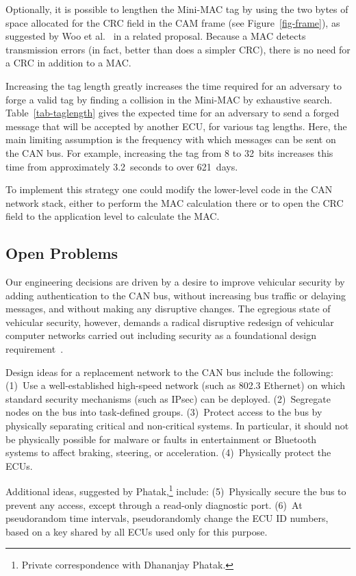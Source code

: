 Optionally, it is possible to lengthen the Mini-MAC tag by 
using the two bytes of space allocated for the CRC field in the CAM frame (see Figure~\ref{fig-frame}),
as suggested by Woo et al.~\cite{Woo-14} in a related proposal.
Because a MAC detects transmission errors (in fact, better than does a simpler CRC), there is no need for
a CRC in addition to a MAC.  

Increasing the tag length greatly increases the time required for an adversary to forge a valid tag by
finding a collision in the Mini-MAC by exhaustive search.  
Table~\ref{tab-taglength} gives the expected time for an adversary to send a forged message 
that will be accepted by another ECU, for various tag lengths.  Here, the main limiting assumption is 
the frequency with which messages can be sent on the CAN bus. 
For example, increasing the tag from 8 to 32~bits increases this time from
approximately 3.2~seconds to over 621~days.

To implement this strategy one could modify the lower-level code in the CAN network stack, 
either to perform the MAC calculation there 
or to open the CRC field to the application level to calculate the MAC.

\subsection{Open Problems}
\label{open}

Our engineering decisions are driven by a desire to improve vehicular security by adding authentication
to the CAN bus, without increasing bus traffic or delaying messages, and without making any
disruptive changes.  The egregious state of vehicular security, however, demands a radical disruptive
redesign of vehicular computer networks carried out including security as a foundational design
requirement~\cite{Wolf2006}. 

Design ideas for a replacement network to the CAN bus include the following:  
(1)~Use a well-established high-speed network (such as 802.3 Ethernet) on which
standard security mechanisms (such as IPsec) can be deployed.
(2)~Segregate nodes on the bus into task-defined groups.
(3)~Protect access to the bus by physically separating critical and non-critical systems.
In particular, it should not be physically possible for malware or faults in entertainment or 
Bluetooth systems to affect braking, steering, or acceleration. 
(4)~Physically protect the ECUs. 

Additional ideas, suggested by Phatak,\footnote{Private correspondence with Dhananjay Phatak.} 
include:
(5)~Physically secure the bus to prevent any access, except through
a read-only diagnostic port.
(6)~At pseudorandom time intervals, pseudorandomly change the ECU ID numbers, 
based on a key shared by all ECUs used only for this purpose.

